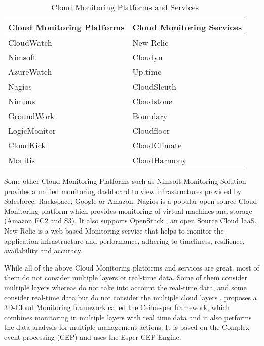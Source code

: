 \documentclass[article,type=msc,colorback,12pt,accentcolor=tud7b,table]{tudthesis}
\begin{document}
\begin{table}[h!]
  \centering
  \caption{Cloud Monitoring Platforms and Services }
  \label{tab:Table1}
  \begin{tabular}{l|l}
  \hline
  \rowcolor[HTML]{FFCB2F}  \textbf{Cloud Monitoring Platforms}  & \textbf{Cloud Monitoring Services} \\
    \hline
    CloudWatch \cite{cloudwatchdev} \cite{cloudwatch} & New Relic \cite{newrelic} \\    
    Nimsoft \cite{nimsoft} & Cloudyn \cite{cloudyn} \\        
    AzureWatch \cite{azurewatch} & Up.time \cite{uptime} \\        
    Nagios \cite{nagios} & CloudSleuth \cite{cloudsleuth} \\
    Nimbus \cite{nimbus} & Cloudstone \cite{cloudstone} \\ 
    GroundWork \cite{groundwork} & Boundary \cite{boundary} \\
    LogicMonitor \cite{logicmonitor} & Cloudfloor \cite{cloudfloor} \\ 
    CloudKick \cite{cloudkick} & CloudClimate \cite{cloudclimate} \\    
    Monitis \cite{monitis} & CloudHarmony \cite{cloudharmony} \\
    \hline
    
  \end{tabular}
\end{table}
	
	Some other Cloud Monitoring Platforms such as Nimsoft Monitoring Solution \cite{nimsoft} provides a unified monitoring dashboard to view infrastructures provided by Salesforce, Rackspace, Google or Amazon. Nagios \cite{nagios} is a popular open source Cloud Monitoring platform which provides monitoring of virtual machines and storage (Amazon EC2 and S3). It also supports OpenStack \cite{openstack}, an open Source Cloud IaaS. New Relic \cite{newrelic} is a web-based Monitoring service that helps to monitor the application infrastructure and performance, adhering to timeliness, resilience, availability and accuracy.
	
	While all of the above Cloud Monitoring platforms and services are great, most of them do not consider multiple layers or real-time data. Some of them consider multiple layers whereas do not take into account the real-time data, and some consider real-time data but do not consider the multiple cloud layers \cite{marquezan20143}. \cite{bruneo2015framework} proposes a 3D-Cloud Monitoring framework called the Ceiloesper framework, which combines monitoring in multiple layers with real time data and it also performs the data analysis for multiple management actions. It is based on the Complex event processing (CEP) and uses the Esper CEP Engine.
 		
\end{document}

